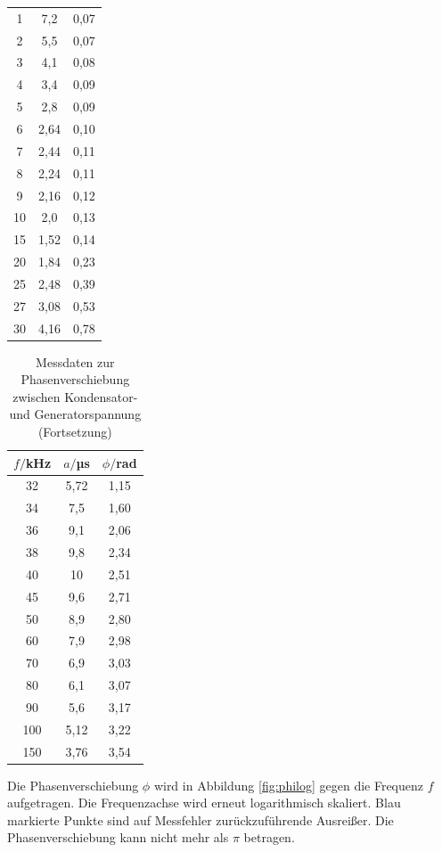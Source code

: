 \begin{table}
\begin{tabular}{c c c}
 1	   &    7,2  & 0,07 \\
 2	   &    5,5  & 0,07 \\
 3	   &    4,1  & 0,08 \\
 4	   &    3,4  & 0,09 \\
 5	   &    2,8  & 0,09 \\
 6	   &    2,64 & 0,10 \\
 7	   &    2,44 & 0,11 \\
 8	   &    2,24 & 0,11 \\
 9	   &    2,16 & 0,12 \\
10	   &    2,0  & 0,13 \\
15	   &    1,52 & 0,14 \\
20	   &    1,84 & 0,23 \\
25	   &    2,48 & 0,39 \\
27	   &    3,08 & 0,53 \\
30	   &    4,16 & 0,78 \\
\bottomrule
\end{tabular}
\end{table}

\begin{table}
\centering
\caption{Messdaten zur Phasenverschiebung zwischen Kondensator- und Generatorspannung (Fortsetzung)}
\label{tab:phase2}
\begin{tabular}{c c c}
\toprule
$f/$kHz & $a/$µs & $\phi/$rad \\
\midrule
32	& 5,72 & 1,15 \\
34	& 7,5  & 1,60 \\
36	& 9,1  & 2,06 \\
38	& 9,8  & 2,34 \\
40	& 10   & 2,51 \\
45	& 9,6  & 2,71 \\
50	& 8,9  & 2,80 \\
60	& 7,9  & 2,98 \\
70	& 6,9  & 3,03 \\
80	& 6,1  & 3,07 \\
90	& 5,6  & 3,17 \\
100 & 5,12 & 3,22 \\
150 & 3,76 & 3,54 \\
\bottomrule
\end{tabular}
\end{table}

Die Phasenverschiebung $\phi$ wird in Abbildung \ref{fig:philog} gegen die Frequenz
$f$ aufgetragen. Die Frequenzachse wird erneut logarithmisch skaliert. Blau markierte
Punkte sind auf Messfehler zurückzuführende Ausreißer. Die Phasenverschiebung kann
nicht mehr als $\pi$ betragen.

